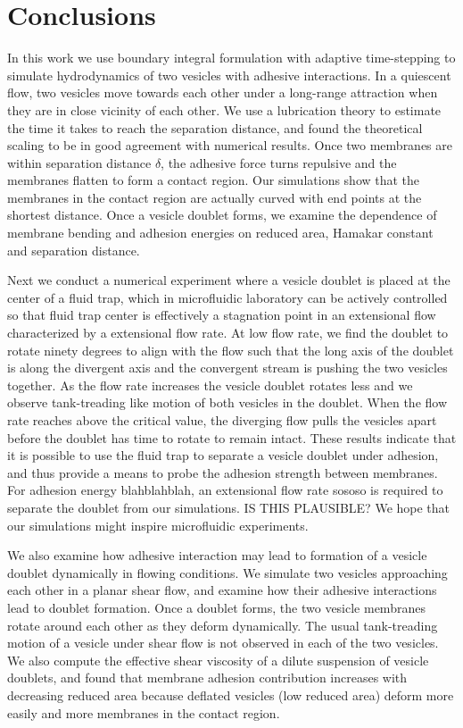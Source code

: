 \documentclass[prf,superscriptaddress,showpacs]{revtex4-1}
\begin{document}
\section{Conclusions\label{sec:conclusions}}
In this work we use boundary integral formulation with adaptive time-stepping  to simulate hydrodynamics of two vesicles with adhesive interactions.
In a quiescent flow,  two vesicles move towards each other under a long-range attraction when they are in close vicinity of each other.
We use a lubrication theory to estimate the time it takes to reach the separation distance, and found the theoretical scaling to be in good agreement with numerical results.  
Once two membranes are within separation distance $\delta$, the adhesive force turns repulsive and the membranes flatten to form a contact region.
Our simulations show that the membranes in the contact region are actually curved with end points at the shortest distance. 
Once a vesicle doublet forms, we examine the dependence of membrane bending and adhesion energies on reduced area, Hamakar constant and separation distance.

Next we conduct a numerical experiment where a vesicle doublet is placed at the center of a fluid trap, which in microfluidic laboratory 
can be actively controlled so that fluid trap center is effectively a stagnation point in an extensional flow characterized by a extensional flow rate.
At low flow rate, we find the doublet to rotate ninety degrees to align with the flow such that 
the long axis of the doublet is along the divergent axis and the convergent stream is pushing the two vesicles
together. As the flow rate increases the vesicle doublet rotates less and we observe tank-treading like motion of both vesicles in the doublet.
When the flow rate reaches above the critical value, the diverging flow pulls the vesicles apart before the doublet has time to rotate to remain intact.
These results indicate that it is possible to use the fluid trap to separate a vesicle doublet under adhesion, and thus provide a means to
probe the adhesion strength between membranes. {\color{red} For adhesion energy blahblahblah, an extensional flow rate sososo is required to separate the doublet from our
simulations. IS THIS PLAUSIBLE?}
We hope that our simulations might inspire microfluidic experiments.

We also examine how adhesive interaction may lead to formation of a vesicle doublet dynamically in flowing conditions.
We simulate two vesicles approaching each other in a planar shear flow, and examine how their adhesive interactions lead to doublet formation.
Once a doublet forms, the two vesicle membranes rotate around each other as they deform dynamically. The usual tank-treading motion of a vesicle under shear flow is not 
observed in each of the two vesicles. We also compute the effective shear viscosity of a dilute suspension of vesicle doublets, and found that membrane adhesion contribution
increases with decreasing reduced area because deflated vesicles (low reduced area) deform more easily and more membranes in the contact region.
\end{document}
